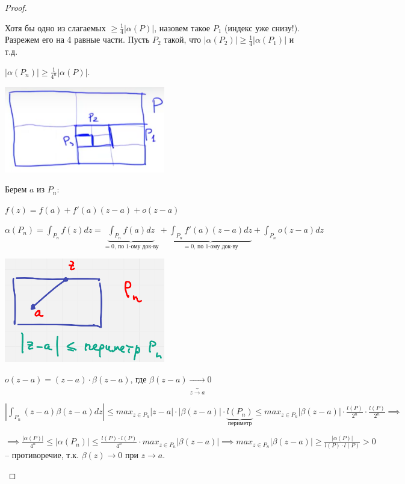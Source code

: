 \begin{proof}
\begin{enumerate}
{            Хотя бы одно из слагаемых $\geq \frac{1}{4} |\alpha(P)|$, назовем такое $P_1$ (индекс уже снизу!). Разрежем его на 4 равные части. Пусть $P_2$ такой, что $|\alpha(P_2)| \geq \frac{1}{4} |\alpha (P_1)|$ и т.д.

            $|\alpha(P_n)| \geq \frac{1}{4^n} |\alpha (P)|$.

            \begin{center}
                \includegraphics[width=7cm]{assets/04-functions-of-complex-variables/Cauchy-theorem-rectangle-partition-2.png}
            \end{center}

            Берем $a$ из $P_n$:

            $f(z) = f(a) + f'(a) (z - a) + o(z - a)$

            $\alpha (P_n) = \int_{P_n} { f(z) dz } = \underbrace{\int_{P_n} { f(a) dz }}_{= 0 \text{, по 1-ому док-ву}} + \underbrace{\int_{P_n} { f'(a) (z - a) dz }}_{= 0 \text{, по 1-ому док-ву}} + \int_{P_n} { o(z - a) dz }$


            \begin{center}
                \includegraphics[width=7cm]{assets/04-functions-of-complex-variables/Cauchy-theorem-rectangle-partition-3.png}
            \end{center} 


            $o(z - a) = (z - a) \cdot \beta (z - a)$, где $\beta(z - a) \underbrace{\rightarrow}_{z \rightarrow a} 0$

            $\left| \int_{P_n} {(z - a) \beta (z - a) dz} \right| \leq max_{z \in P_n} { |z - a| \cdot |\beta (z - a)| } \cdot \underbrace{l(P_n)}_{\text{периметр}} \leq max_{z \in P_n} { |\beta (z - a)| } \cdot \frac{l(P)}{2^n} \cdot \frac{l(P)}{2^n} \implies$

            $\implies \frac{|\alpha (P)|}{4^n} \leq |\alpha(P_n)| \leq \frac{l(P) \cdot l(P)}{4^n} \cdot max_{z \in P_n} |\beta (z - a)| \implies max_{z \in P_n} |\beta (z - a)| \geq \frac{|\alpha (P)|}{l(P) \cdot l(P)} > 0$ -- противоречие, т.к. $\beta(z) \rightarrow 0$ при $z \rightarrow a$.
        }
    \end{enumerate}
\end{proof}
